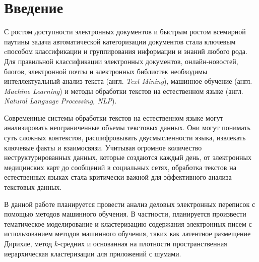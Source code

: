 \chapter*{Введение}

С ростом доступности электронных документов и быстрым ростом всемирной паутины задача автоматической категоризации документов стала ключевым cпособом классификации и группирования информации и знаний любого рода. Для правильной классификации электронных документов, онлайн-новостей, блогов, электронной почты и электронных библиотек необходимы интеллектуальный анализ текста (англ. \textit{Text Mining}), машинное обучение (англ. \textit{Machine Learning}) и методы обработки текстов на естественном языке (англ. \textit{Natural Language Processing, NLP}).

Современные системы обработки текстов на естественном языке
могут анализировать неограниченные объемы текстовых данных. Они могут понимать суть сложных контекстов, расшифровывать двусмысленности языка, извлекать ключевые факты и взаимосвязи. Учитывая огромное количество неструктурированных данных, которые создаются каждый день, от электронных медицинских карт до сообщений в социальных сетях, обработка текстов на естественных языках стала критически важной для эффективного анализа текстовых данных.

В данной работе планируется провести анализ деловых электронных переписок с помощью методов машинного обучения. В частности, планируется произвести тематическое моделирование и кластеризацию содержания электронных писем с использованием методов машинного обучения, таких как латентное размещение Дирихле, метод $k$-средних и основанная на плотности пространственная иерархическая кластеризации для приложений с шумами. 

\clearpage

